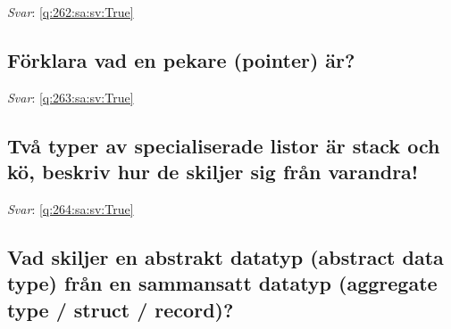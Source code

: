 \documentclass[a4paper,11pt,oneside]{article}
\begin{document}
\begin{sloppypar}
\label{q:262:sa:sv:False}

\vspace{2cm}

\noindent\makebox[\textwidth]{\hrulefill}

\vspace{1cm}

\textit{Svar}: \autoref{q:262:sa:sv:True}



\subsection{F\"orklara vad en pekare (pointer) \"ar?}

\label{q:263:sa:sv:False}

\vspace{2cm}

\noindent\makebox[\textwidth]{\hrulefill}

\vspace{1cm}

\textit{Svar}: \autoref{q:263:sa:sv:True}



\subsection{Tv\r{a} typer av specialiserade listor \"ar stack och k\"o, beskriv hur de skiljer sig fr\r{a}n varandra!}

\label{q:264:sa:sv:False}

\vspace{2cm}

\noindent\makebox[\textwidth]{\hrulefill}

\vspace{1cm}

\textit{Svar}: \autoref{q:264:sa:sv:True}



\subsection{Vad skiljer en abstrakt datatyp (abstract data type) fr\r{a}n en sammansatt datatyp (aggregate type / struct / record)?}

\label{q:265:sa:sv:False}

\vspace{2cm}

\noindent\makebox[\textwidth]{\hrulefill}

\vspace{1cm}


\end{sloppypar}
\end{document}
